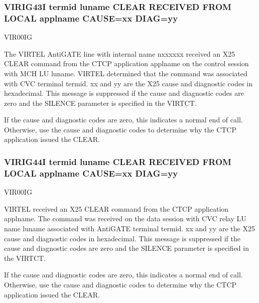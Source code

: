\documentclass[letterpaper,10pt,english]{sphinxmanual}
\begin{document}
\subsubsection{VIRIG43I termid luname CLEAR RECEIVED FROM LOCAL applname CAUSE=xx DIAG=yy}
\label{\detokenize{messages:virig43i-termid-luname-clear-received-from-local-applname-cause-xx-diag-yy}}\begin{description}
\sphinxAtStartPar
VIR00IG

\sphinxAtStartPar
The VIRTEL AntiGATE line with internal name n\sphinxhyphen{}xxxxxx received an X25 CLEAR command from the CTCP application applname on the control session with MCH LU luname. VIRTEL determined that the command was associated with CVC terminal termid. xx and yy are the X25 cause and diagnostic codes in hexadecimal. This message is suppressed if the cause and diagnostic codes are zero and the SILENCE parameter is specified in the VIRTCT.

\sphinxAtStartPar
If the cause and diagnostic codes are zero, this indicates a normal end of call. Otherwise, use the cause and diagnostic codes to determine why the CTCP application issued the CLEAR.

\end{description}


\subsubsection{VIRIG44I termid luname CLEAR RECEIVED FROM LOCAL applname CAUSE=xx DIAG=yy}
\label{\detokenize{messages:virig44i-termid-luname-clear-received-from-local-applname-cause-xx-diag-yy}}\begin{description}
\sphinxAtStartPar
VIR00IG

\sphinxAtStartPar
VIRTEL received an X25 CLEAR command from the CTCP application applname. The command was received on the data session with CVC relay LU name luname associated with AntiGATE terminal termid. xx and yy are the X25 cause and diagnostic codes in hexadecimal. This message is suppressed if the cause and diagnostic codes are zero and the SILENCE parameter is specified in the VIRTCT.

\sphinxAtStartPar
If the cause and diagnostic codes are zero, this indicates a normal end of call. Otherwise, use the cause and diagnostic codes to determine why the CTCP application issued the CLEAR.

\end{description}
\end{document}
